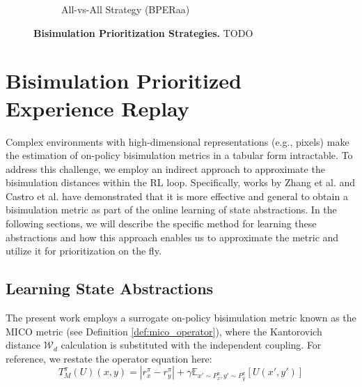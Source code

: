 \begin{figure}[H]
\begin{subfigure}{0.45\textwidth}
        \caption{All-vs-All Strategy (BPERaa)}
        \label{fig:all_vs_all}
    \end{subfigure}
    \caption[Bisimulation Prioritization Strategies]{\textbf{Bisimulation Prioritization Strategies.} TODO}
    \label{fig:bper_strategies}
\end{figure}

\section{Bisimulation Prioritized Experience Replay}
\label{sec:bper_method}


Complex environments with high-dimensional representations (e.g., pixels) make the estimation of on-policy bisimulation metrics in a tabular form intractable. To address this challenge, we employ an indirect approach to approximate the bisimulation distances within the RL loop. Specifically, works by Zhang et al. \cite{zhang2020learning} and Castro et al. \cite{castro2021mico} have demonstrated that it is more effective and general to obtain a bisimulation metric as part of the online learning of state abstractions. In the following sections, we will describe the specific method for learning these abstractions and how this approach enables us to approximate the metric and utilize it for prioritization on the fly.

\subsection{Learning State Abstractions}

The present work employs a surrogate on-policy bisimulation metric known as the MICO metric \cite{castro2021mico} (see Definition \ref{def:mico_operator}), where the Kantorovich distance $\mathcal{W}_d$ calculation is substituted with the independent coupling. For reference, we restate the operator equation here:
$$
\label{eq:mico_operator}
    T^\pi_M(U)(x, y) = |r^\pi_{x} - r^\pi_{y}| + \gamma \mathbb{E}_{x'\sim P_x^\pi, y'\sim P_y^\pi}\left[U(x',y') \right]
$$


